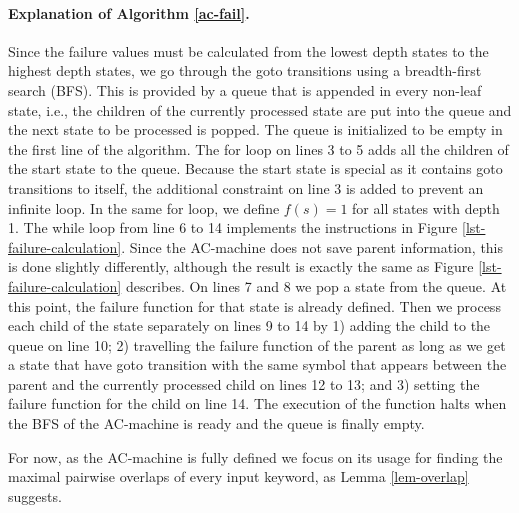 \documentclass[english,twoside,censored,csm,algorithms-track-2020]{HYthesisML}
\theoremstyle{plain}
\theoremstyle{definition}
\begin{document}
  \paragraph{Explanation of Algorithm \ref{ac-fail}.}
  Since the failure values must be calculated from the lowest depth states to the highest depth states,
  we go through the goto transitions using a breadth-first search (BFS). This is provided by a queue that is
  appended in every non-leaf state, i.e., the children of the currently processed state are put into the
  queue and the next state to be processed is popped. The queue is initialized to be empty in the first
  line of the algorithm. The for loop on lines 3 to 5 adds all the children of the start state to the queue.
  Because the start state is special as it contains goto transitions to itself, the additional constraint
  on line 3 is added to prevent an infinite loop. In the same for loop, we define
  $f(s)=1$ for all states with depth 1. The while loop from line 6 to 14 implements the instructions
  in Figure \ref{lst-failure-calculation}. Since the AC-machine does not save parent information,
  this is done slightly differently, although the result is exactly the same as Figure
  \ref{lst-failure-calculation} describes. On lines 7 and 8 we pop a
  state from the queue. At this point, the failure function for that state is already defined. Then we
  process each child of the state separately on lines 9 to 14 by 1) adding the child to the
  queue  on line 10; 2) travelling the failure function of the parent as long as we get a state
  that have goto   transition with the same symbol that appears between the parent and the currently
  processed child on lines 12 to 13; and 3) setting the failure function for the child on line 14.
  The execution of the function halts when the BFS of the  AC-machine is ready and the queue is
  finally empty.

  For now, as the AC-machine is fully defined we focus on its usage for finding the maximal pairwise
  overlaps of every input keyword, as Lemma \ref{lem-overlap} suggests.
\end{document}
